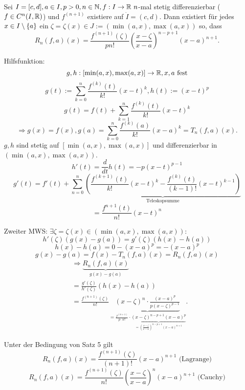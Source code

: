 \documentclass[../ana2.tex]{subfiles}
\begin{document}
\begin{satz}
    Sei \(I = [c,d], a\in I, p > 0, n\in\mathbb{N}, 
    f:I\rightarrow \mathbb{R}\ n\)-mal stetig differenzierbar 
    (\( f \in C^n(I,\mathbb{R}) \)) und \( f^{(n+1)} \) 
    existiere auf \( \dot{I} = (c,d) \). Dann existiert für 
    jedes \( x\in I \setminus \{a\} \) ein 
    \( \zeta = \zeta(x) \in J := (\min(a,x), \max(a,x)) \) 
    so, dass     
    \[ R_n(f,a)(x) = \frac{f^{(n+1)}(\zeta)}{ pn! } 
    \left( \frac{x - \zeta}{x - a} \right)^{n-p+1} (x-a)^{n+1}. \]
\end{satz}
\begin{bew}
    Hilfsfunktion: 
    \[ g,h:[\min(a,x), \max(a,x)]\rightarrow \mathbb{R}, x,a \text{ fest} \]
    \[ g(t) := \sum_{k=0}^n \frac{f^{(k)}(t)}{k!} (x-t)^k, 
    h(t) := (x-t)^p \]
    \[ g(t) = f(t) + \sum_{k=1}^n \frac{f^{(k)}(t)}{k!} (x-t)^k \]
    \[ \Rightarrow g(x) = f(x), 
    g(a) = \sum_{k=0}^{n}  \frac{f^{(k)}(a)}{k!} 
    (x-a)^k = T_n(f,a)(x).\]
    \( g, h \) sind stetig auf \( [\min(a,x), \max(a,x)] \) und
    differenzierbar in \( (\min(a,x), \max(a,x)) \).
    \[ h'(t) = \frac{d}{dt} h(t) = -p(x-t)^{p-1} \]
    \[ g'(t) = f'(t) + \sum_{n=0}^{n} 
    \underbrace{\left( \frac{f^{(k+1)}(t)}{k!} (x-t)^k
    - \frac{f^{(k)}(t)}{(k-1)!} (x-t)^{k-1} \right)}_{\text{Teleskopsumme}} \]
    \[ = \frac{f^{n+1}(t)}{n!}(x-t)^n \]

    Zweiter MWS: \( \exists \zeta = \zeta(x) 
    \in (\min(a,x), \max(a,x)) \):
    \[ h'(\zeta)(g(x) - g(a)) = g'(\zeta)(h(x) - h(a)) \]
    \[ h(x) - h(a) = 0 - (x-a)^p = -(x-a)^p \]
    \[ g(x) - g(a) = f(x) - T_n(f,a)(x) = R_n(f,a)(x) \]
    \begin{align*}
        &\Rightarrow \underbrace{R_n(f,a)(x)}_{g(x)-g(a)} \\
        &= \frac{g'(\zeta)}{h'(\zeta)}(h(x)-h(a)) \\
        &= \frac{f^{(n+1)}(\zeta)}{n!}
        \underbrace{(x-\zeta)^n \cdot \frac{(x-a)^p}{p(x-\zeta)^{p-1}}}_
        {= \frac{f^{(n+1)}}{p \cdot n!} 
        \cdot \underbrace{(x-\zeta)^{n-p+1}(x-a)^p}_
        {= \left( \frac{x-\zeta}{x-a} \right)^{n-p+1} (x-a)^{n+1}}}.
    \end{align*}
\end{bew}
\begin{kor}
    Unter der Bedingung von Satz 5 gilt 
    \[ R_n(f,a)(x) = \frac{f^{(n+1)}(\zeta)}{(n+1)!} (x-a)^{n+1} \text{ (Lagrange)} \]
    \[ R_n(f,a)(x) = \frac{f^{(n+1)}(\zeta)}{n!} 
    \left( \frac{x- \zeta}{x-a} \right)^n (x-a)^{n+1} \text{ (Cauchy)} \]
\end{kor}
\end{document}
